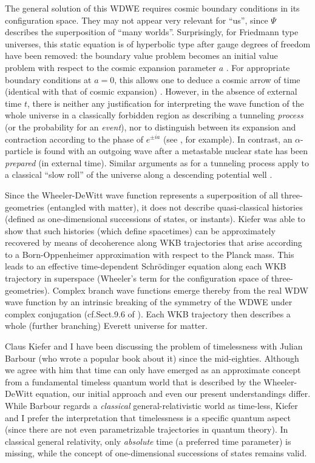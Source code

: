 \documentclass[12pt]{article}
\newcommand{\ts}{\hspace{3pt}}
\begin{document}
The general solution of this WDWE requires cosmic boundary
conditions in its configuration space. They may not appear very
relevant for ``us'', since $\Psi$ describes the superposition of
``many worlds''. Surprisingly, for Friedmann type universes, this
static equation is of hyperbolic type after gauge degrees of freedom
have been removed: the boundary value problem becomes an initial value
problem with respect to the cosmic expansion parameter $a$ \cite{Z86}.
For appropriate boundary conditions at $a=0$, this allows one to deduce
a cosmic arrow of time (identical with that of cosmic expansion)
\cite{TD}. However, in the absence of external time $t$, there is
neither any justification for interpreting the wave function of the
whole universe in a classically forbidden region as describing a
tunneling {\it process} (or the probability for an {\it event}), nor
to distinguish between its expansion and contraction according to the
phase of $e^{\pm ia}$ (see
\cite{Vilenkin}, for example). In contrast, an
$\alpha$-particle is found with an outgoing wave after a metastable
nuclear state has been {\it prepared} (in external time). Similar
arguments as for a tunneling process apply to a classical ``slow
roll'' of the universe along a descending potential well
\cite{ST}.

Since the Wheeler-DeWitt wave function represents a superposition of
all three-geometries (entangled with matter), it does not
describe quasi-classical histories (defined as
one-dimensional successions of states, or instants). Kiefer was able
to show \cite{Kiefer} that such histories (which define spacetimes)
can be approximately recovered by means of decoherence along WKB
trajectories that arise according to a Born-Oppen\-heimer
approximation with respect to the Planck mass. This leads to an
effective time-dependent Schr\"odinger equation along each WKB
trajectory in superspace (Wheeler's term for the configuration  space
of three-geo\-metries). Complex branch wave functions emerge thereby
from the real WDW wave function by an intrinsic breaking of the
symmetry  of the WDWE under complex conjugation (cf.\ts Sect.\ts 9.6
of
\cite{Giulini}). Each WKB trajectory then describes a whole
(further branching) Everett universe for matter.

Claus Kiefer and I have been discussing the problem of timelessness
with Julian Barbour (who wrote a popular book \cite{Barbour} about it)
since the mid-eighties. Although we agree with him that time can only
have emerged as an approximate concept from a fundamental timeless
quantum world that is described by the Wheeler-DeWitt equation, our
initial approach and even our present understandings differ. While
Barbour regards a {\it classical} general-relativistic world as
time-less, Kiefer and I prefer the interpretation that timelessness is
a specific quantum aspect (since there are not even parametrizable
trajectories in quantum theory). In classical general relativity, only
{\it absolute} time (a preferred time parameter) is missing, while the
concept of one-dimensional successions of states remains valid.
\end{document}
